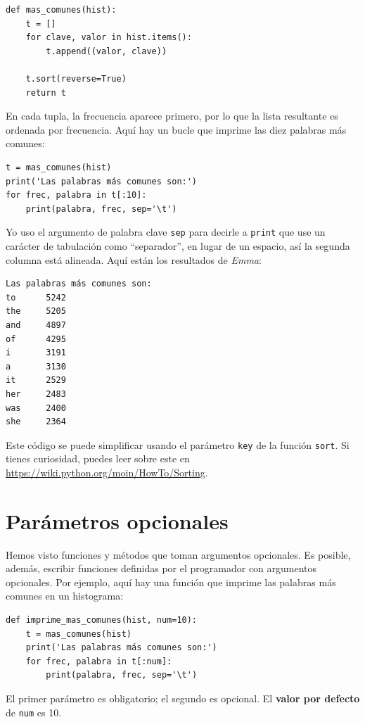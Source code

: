 \documentclass[10pt]{book}
\begin{document}
\begin{verbatim}
def mas_comunes(hist):
    t = []
    for clave, valor in hist.items():
        t.append((valor, clave))

    t.sort(reverse=True)
    return t
\end{verbatim}

En cada tupla, la frecuencia aparece primero, por lo que la lista resultante es
ordenada por frecuencia.  Aquí hay un bucle que imprime las diez palabras más
comunes:

\begin{verbatim}
t = mas_comunes(hist)
print('Las palabras más comunes son:')
for frec, palabra in t[:10]:
    print(palabra, frec, sep='\t')
\end{verbatim}
%
Yo uso el argumento de palabra clave {\tt sep} para decirle a {\tt print} que use un
carácter de tabulación como ``separador'', en lugar de un espacio, así la segunda
columna está alineada.  Aquí están los resultados de {\em Emma}:

\begin{verbatim}
Las palabras más comunes son:
to      5242
the     5205
and     4897
of      4295
i       3191
a       3130
it      2529
her     2483
was     2400
she     2364
\end{verbatim}
%
Este código se puede simplificar usando el parámetro {\tt key} de
la función {\tt sort}.  Si tienes curiosidad, puedes leer sobre este
en \url{https://wiki.python.org/moin/HowTo/Sorting}.


\section{Parámetros opcionales}

Hemos visto funciones y métodos que toman argumentos
opcionales.  Es posible, además, escribir funciones definidas por el programador
con argumentos opcionales.  Por ejemplo, aquí hay una función que
imprime las palabras más comunes en un histograma:

\begin{verbatim}
def imprime_mas_comunes(hist, num=10):
    t = mas_comunes(hist)
    print('Las palabras más comunes son:')
    for frec, palabra in t[:num]:
        print(palabra, frec, sep='\t')
\end{verbatim}

El primer parámetro es obligatorio; el segundo es opcional.
El {\bf valor por defecto} de {\tt num} es 10.
\end{document}
